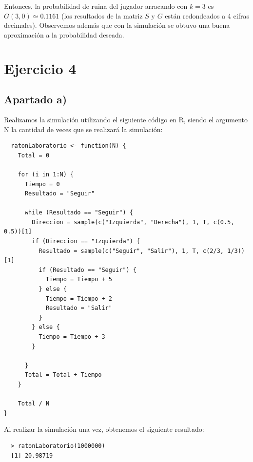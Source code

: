 \documentclass[11pt]{article}
\begin{document}
Entonces, la probabilidad de ruina del jugador arracando con $ k = 3 $ es $ G(3, 0) \simeq 0.1161 $ (los resultados de la 
matriz $S$ y $G$ están redondeados a 4 cifras decimales). Observemos además que con la simulación
se obtuvo una buena aproximación a la probabilidad deseada.


\section{Ejercicio 4}

\subsection*{Apartado a)}

Realizamos la simulación utilizando el siguiente código en R, siendo el 
argumento N la cantidad de veces que se realizará la simulación:

\begin{verbatim}
  ratonLaboratorio <- function(N) {
    Total = 0

    for (i in 1:N) {
      Tiempo = 0
      Resultado = "Seguir"

      while (Resultado == "Seguir") {
        Direccion = sample(c("Izquierda", "Derecha"), 1, T, c(0.5, 0.5))[1]
        if (Direccion == "Izquierda") {
          Resultado = sample(c("Seguir", "Salir"), 1, T, c(2/3, 1/3))[1]
          if (Resultado == "Seguir") {
            Tiempo = Tiempo + 5
          } else {
            Tiempo = Tiempo + 2
            Resultado = "Salir"
          }
        } else {
          Tiempo = Tiempo + 3
        }

      }
      Total = Total + Tiempo
    }
  
    Total / N
}
\end{verbatim}

Al realizar la simulación una vez, obtenemos el siguiente resultado:

\begin{verbatim}
  > ratonLaboratorio(1000000)
  [1] 20.98719
\end{verbatim}

\end{document}
